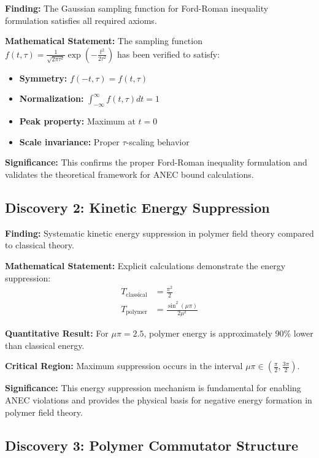 \documentclass[11pt]{article}
\begin{document}
\textbf{Finding:} The Gaussian sampling function for Ford-Roman inequality formulation satisfies all required axioms.

\textbf{Mathematical Statement:} 
The sampling function $f(t,\tau) = \frac{1}{\sqrt{2\pi\tau^2}}\exp\left(-\frac{t^2}{2\tau^2}\right)$ has been verified to satisfy:
\begin{itemize}
    \item \textbf{Symmetry:} $f(-t,\tau) = f(t,\tau)$
    \item \textbf{Normalization:} $\int_{-\infty}^{\infty} f(t,\tau) dt = 1$
    \item \textbf{Peak property:} Maximum at $t = 0$
    \item \textbf{Scale invariance:} Proper $\tau$-scaling behavior
\end{itemize}

\textbf{Significance:} This confirms the proper Ford-Roman inequality formulation and validates the theoretical framework for ANEC bound calculations.

\subsection{Discovery 2: Kinetic Energy Suppression}

\textbf{Finding:} Systematic kinetic energy suppression in polymer field theory compared to classical theory.

\textbf{Mathematical Statement:}
Explicit calculations demonstrate the energy suppression:
\begin{align}
T_{\text{classical}} &= \frac{\pi^2}{2} \\
T_{\text{polymer}} &= \frac{\sin^2(\mu\pi)}{2\mu^2}
\end{align}

\textbf{Quantitative Result:} For $\mu\pi = 2.5$, polymer energy is approximately 90\% lower than classical energy.

\textbf{Critical Region:} Maximum suppression occurs in the interval $\mu\pi \in \left(\frac{\pi}{2}, \frac{3\pi}{2}\right)$.

\textbf{Significance:} This energy suppression mechanism is fundamental for enabling ANEC violations and provides the physical basis for negative energy formation in polymer field theory.

\subsection{Discovery 3: Polymer Commutator Structure}
\end{document}
